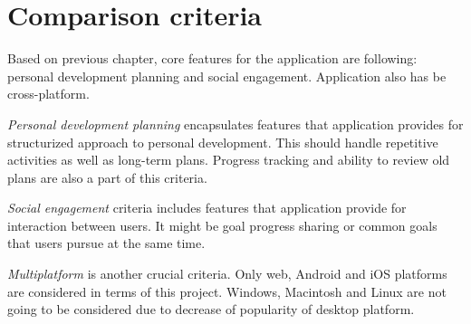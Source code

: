
\section{Comparison criteria}\label{sec:comparison-criteria}



Based on previous chapter, core features for the application are following: personal development planning and social engagement.
Application also has be cross-platform.

\textit{Personal development planning} encapsulates features that application provides for structurized approach to personal development.
This should handle repetitive activities as well as long-term plans.
Progress tracking and ability to review old plans are also a part of this criteria.

\textit{Social engagement} criteria includes features that application provide for interaction between users.
It might be goal progress sharing or common goals that users pursue at the same time.

\textit{Multiplatform} is another crucial criteria.
Only web, Android and iOS platforms are considered in terms of this project.
Windows, Macintosh and Linux are not going to be considered due to decrease of popularity of desktop platform.\cite{mobile-vs-desktop}

